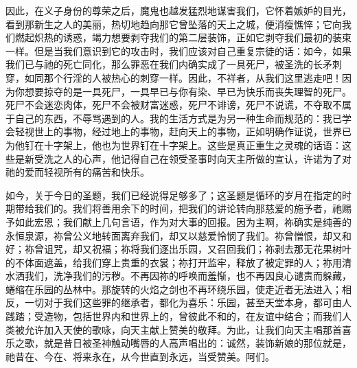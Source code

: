 因此，在义子身份的尊荣之后，魔鬼也越发猛烈地谋害我们，它怀着嫉妒的目光，看到那新生之人的美丽，热切地趋向那它曾坠落的天上之城，便消瘦憔悴；它向我们燃起炽热的诱惑，竭力想要剥夺我们的第二层装饰，正如它剥夺我们最初的装束一样。但是当我们意识到它的攻击时，我们应该对自己重复宗徒的话：如今，如果我们已与祂的死亡同化，那么罪恶在我们内确实成了一具死尸，被圣洗的长矛刺穿，如同那个行淫的人被热心的刺穿一样。因此，不祥者，从我们这里逃走吧！因为你想要掠夺的是一具死尸，一具早已与你有染、早已为快乐而丧失理智的死尸。死尸不会迷恋肉体，死尸不会被财富迷惑，死尸不诽谤，死尸不说谎，不夺取不属于自己的东西，不辱骂遇到的人。我的生活方式是为另一种生命而规范的：我已学会轻视世上的事物，经过地上的事物，赶向天上的事物，正如明确作证说，世界已为他钉在十字架上，他也为世界钉在十字架上。这些是真正重生之灵魂的话语：这些是新受洗之人的心声，他记得自己在领受圣事时向天主所做的宣认，许诺为了对祂的爱而轻视所有的痛苦和快乐。\par

如今，关于今日的圣题，我们已经说得足够多了；这圣题是循环的岁月在指定的时期带给我们的。我们将善用余下的时间，把我们的讲论转向那慈爱的施予者，祂赐予如此宏恩；我们献上几句言语，作为对大事的回报。因为主啊，祢确实是纯善的永恒泉源，祢曾公义地转面离弃我们，却又以慈爱怜悯了我们。祢曾憎恨，却又和好；祢曾诅咒，却又祝福；祢将我们逐出乐园，又召回我们；祢剥去那无花果树叶的不体面遮盖，给我们穿上贵重的衣裳；祢打开监牢，释放了被定罪的人；祢用清水洒我们，洗净我们的污秽。不再因祢的呼唤而羞惭，也不再因良心谴责而躲藏，蜷缩在乐园的丛林中。那旋转的火焰之剑也不再环绕乐园，使走近者无法进入；相反，一切对于我们这些罪的继承者，都化为喜乐：乐园，甚至天堂本身，都可由人践踏；受造物，包括世界内和世界上的，曾彼此不和的，在友谊中结合；而我们人类被允许加入天使的歌咏，向天主献上赞美的敬拜。为此，让我们向天主唱那首喜乐之歌，就是昔日被圣神触动嘴唇的人高声唱出的：诚然，装饰新娘的那位就是，祂昔在、今在、将来永在，从今世直到永远，当受赞美。阿们。\par

